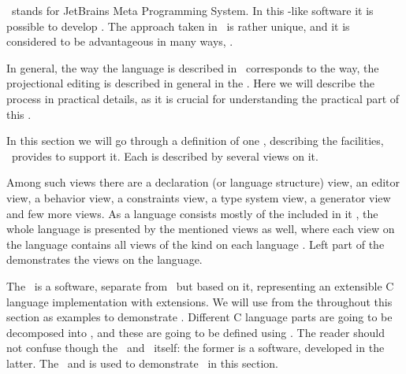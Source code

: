 

\jbmps\ stands for JetBrains Meta Programming System. In this -like software it is possible to develop .
The approach taken in \jbmps\ is rather unique, and it is considered to be advantageous in many ways, \cite{Voelter:MoDELS:2010}.



In general, the way the language is described in \jbmps\ corresponds to the way, the projectional editing is described in general 
in the .
Here we will describe the process in practical details, as it is crucial for understanding the practical part of this \MT.

In this section we will go through a definition of one , describing the facilities, \jbmps\ provides to support
it. Each  is described by several views on it. 



Among such views there are a  declaration (or language structure) view, an editor view, a behavior view, a constraints view, 
a type system view, a generator view and few more views. As a language consists mostly of the included in it , 
the whole language is presented by the mentioned views as well, where each view on the language contains all views of the kind on each language . 
Left part of the  demonstrates the views on the  language.


The \mbp\ is a software, separate from \jbmps\, but based on it, representing an extensible C language implementation with extensions.
We will use  from the \mbp throughout this section as examples to demonstrate \jbmps. Different C language parts are going to be 
decomposed into , and these  are going to be defined using \jbmps. The reader should not confuse though the \mbp\ and 
\jbmps\ itself: the former is a software, developed in the latter. The \mbdp\ and is used to demonstrate \jbmps\ in this section.

